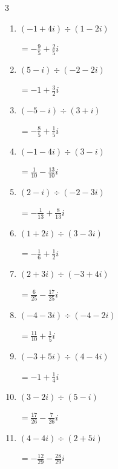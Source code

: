\begin{multicols}{3}
\begin{enumerate}
        $\displaystyle =-\frac{25}{41}+\frac{21}{41}i$

\columnbreak %

\resetques

  \item $\displaystyle (-1+4i)\div(1-2i)$

        $\displaystyle =-\frac{9}{5}+\frac{2}{5}i$

  \item $\displaystyle (5-i)\div(-2-2i)$

        $\displaystyle =-1+\frac{3}{2}i$

  \item $\displaystyle (-5-i)\div(3+i)$

        $\displaystyle =-\frac{8}{5}+\frac{1}{5}i$

  \item $\displaystyle (-1-4i)\div(3-i)$

        $\displaystyle =\frac{1}{10}-\frac{13}{10}i$

  \item $\displaystyle (2-i)\div(-2-3i)$

        $\displaystyle =-\frac{1}{13}+\frac{8}{13}i$

  \item $\displaystyle (1+2i)\div(3-3i)$

        $\displaystyle =-\frac{1}{6}+\frac{1}{2}i$

  \item $\displaystyle (2+3i)\div(-3+4i)$

        $\displaystyle =\frac{6}{25}-\frac{17}{25}i$

  \item $\displaystyle (-4-3i)\div(-4-2i)$

        $\displaystyle =\frac{11}{10}+\frac{1}{5}i$

  \item $\displaystyle (-3+5i)\div(4-4i)$

        $\displaystyle =-1+\frac{1}{4}i$

  \item $\displaystyle (3-2i)\div(5-i)$

        $\displaystyle =\frac{17}{26}-\frac{7}{26}i$

\columnbreak %

  \item $\displaystyle (4-4i)\div(2+5i)$

        $\displaystyle =-\frac{12}{29}-\frac{28}{29}i$


\end{enumerate}
\end{multicols}
